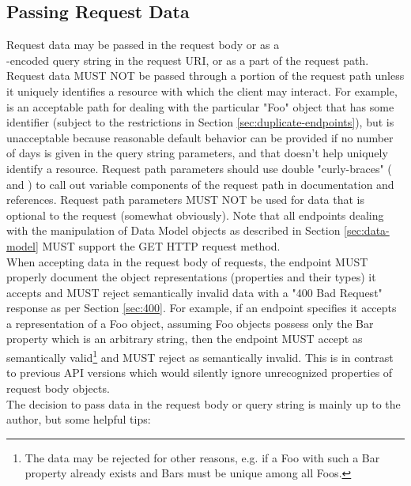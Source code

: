 \subsection{Passing Request Data}
Request data may be passed in the request body or as a\\
-encoded query string in the request URI, or as a part of the
request path. Request data MUST NOT be passed through a portion of the request path unless it uniquely identifies a resource with which the client may
interact. For example,  is an acceptable path for dealing with the particular "Foo" object that has some identifier  (subject
to the restrictions in Section \ref{sec:duplicate-endpoints}), but  is unacceptable because reasonable default behavior can
be provided if no number of days is given in the query string parameters, and that doesn't help uniquely identify a resource. Request path parameters should
use double "curly-braces" (\code{\{} and \code{\}}) to call out variable components of the request path in documentation and references. Request path parameters
MUST NOT be used for data that is optional to the request (somewhat obviously). Note that all endpoints dealing with the manipulation of Data Model objects as
described in Section \ref{sec:data-model} MUST support the GET HTTP request method.\\
When accepting data in the request body of requests, the endpoint MUST properly
document the object representations (properties and their types) it accepts and
MUST reject semantically invalid data with a "400 Bad Request" response as per
Section \ref{sec:400}. For example, if an endpoint specifies it accepts a
representation of a Foo object, assuming Foo objects possess only the Bar
property which is an arbitrary string, then the endpoint MUST accept
 as semantically valid\footnote{The data may be
rejected for other reasons, e.g. if a Foo with such a Bar property already
exists and Bars must be unique among all Foos.} and MUST reject
 as semantically invalid.
This is in contrast to previous API versions which would silently ignore
unrecognized properties of request body objects.\\
The decision to pass data in the request body or query string is mainly up to the author, but some helpful tips:

